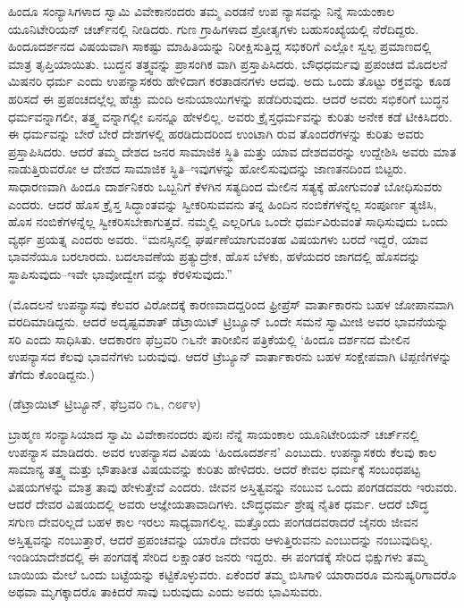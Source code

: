 ಹಿಂದೂ ಸಂನ್ಯಾಸಿಗಳಾದ ಸ್ವಾಮಿ ವಿವೇಕಾನಂದರು ತಮ್ಮ ಎರಡನೆ ಉಪ ನ್ಯಾಸವನ್ನು ನಿನ್ನೆ ಸಾಯಂಕಾಲ ಯೂನಿಟೇರಿಯನ್​ ಚರ್ಚ್​ನಲ್ಲಿ ನೀಡಿದರು. ಗುಣ ಗ್ರಾಹಿಗಳಾದ ಶ್ರೋತೃಗಳು ಬಹುಸಂಖ್ಯೆಯಲ್ಲಿ ನೆರೆದಿದ್ದರು. ಹಿಂದೂದರ್ಶನದ ವಿಷಯವಾಗಿ ಸಾಕಷ್ಟು ಮಾಹಿತಿಯನ್ನು ನಿರೀಕ್ಷಿಸುತ್ತಿದ್ದ ಸಭಿಕರಿಗೆ ಎಲ್ಲೋ ಸ್ವಲ್ಪ ಪ್ರಮಾಣದಲ್ಲಿ ಮಾತ್ರ ತೃಪ್ತಿಯಾಯಿತು. ಬುದ್ಧನ ತತ್ತ್ವವನ್ನು ಪ್ರಾಸಂಗಿಕ ವಾಗಿ ಪ್ರಸ್ತಾಪಿಸಿದರು. ಬೌಧಧರ್ಮವು ಪ್ರಪಂಚದ ಮೊದಲನೆ ಮಿಷನರಿ ಧರ್ಮ ಎಂದು ಉಪನ್ಯಾಸಕರು ಹೇಳಿದಾಗ ಕರತಾಡನಗಳು ಆದವು. ಅದು ಒಂದು ತೊಟ್ಟು ರಕ್ತವನ್ನು ಕೂಡ ಹರಿಸದೆ ಈ ಪ್ರಪಂಚದಲ್ಲೆಲ್ಲ ಹೆಚ್ಚು ಮಂದಿ ಅನುಯಾಯಿಗಳನ್ನು ಪಡೆದಿರುವುದು. ಆದರೆ ಅವರು ಸಭಿಕರಿಗೆ ಬುದ್ಧನ ಧರ್ಮವನ್ನಾಗಲೀ, ತತ್ತ್ವ ವನ್ನಾಗಲ್ಲೀ ಏನನ್ನೂ ಹೇಳಲಿಲ್ಲ. ಅವರು ಕ್ರೈಸ್ತಧರ್ಮವನ್ನು ಕುರಿತು ಅನೇಕ ಕಡೆ ಟೀಕಿಸಿದರು. ಈ ಧರ್ಮವನ್ನು ಬೇರೆ ಬೇರೆ ದೇಶಗಳಲ್ಲಿ ಹರಡಿದುದರಿಂದ ಉಂಟಾಗಿ ರುವ ತೊಂದರೆಗಳನ್ನು ಕುರಿತು ಅವರು ಪ್ರಸ್ತಾಪಿಸಿದರು. ಆದರೆ ತಮ್ಮ ದೇಶದ ಜನರ ಸಾಮಾಜಿಕ ಸ್ಥಿತಿ ಮತ್ತು ಯಾವ ದೇಶದವರನ್ನು ಉದ್ದೇಶಿಸಿ ಅವರು ಮಾತ ನಾಡುತ್ತಿರುವರೋ ಆ ದೇಶದ ಸಾಮಾಜಿಕ ಸ್ಥಿತಿ–ಇವುಗಳನ್ನು ಹೋಲಿಸುವುದನ್ನು ಜಾಣತನದಿಂದ ಬಿಟ್ಟರು. ಸಾಧಾರಣವಾಗಿ ಹಿಂದೂ ದಾರ್ಶನಿಕರು ಒಬ್ಬನಿಗೆ ಕೆಳಗಿನ ಸತ್ಯದಿಂದ ಮೇಲಿನ ಸತ್ಯಕ್ಕೆ ಹೋಗುವಂತೆ ಬೋಧಿಸುವರು ಎಂದರು. ಆದರೆ ಹೊಸ ಕ್ರೈಸ್ತ ಸಿದ್ಧಾಂತವನ್ನು ಸ್ವೀಕರಿಸುವವನು ತನ್ನ ಹಿಂದಿನ ನಂಬಿಕೆಗಳನ್ನೆಲ್ಲ ಸಂಪೂರ್ಣ ತ್ಯಜಿಸಿ, ಹೊಸ ನಂಬಿಕೆಗಳನ್ನೆಲ್ಲ ಸ್ವೀಕರಿಸಬೇಕಾಗುತ್ತದೆ. ನಮ್ಮಲ್ಲಿ ಎಲ್ಲರಿಗೂ ಒಂದೇ ಧರ್ಮವಿರುವಂತೆ ಸಾಧಿಸುವುದು ಒಂದು ವ್ಯರ್ಥ ಪ್ರಯತ್ನ ಎಂದರು ಅವರು. “ಮನಸ್ಸಿನಲ್ಲಿ ಘರ್ಷಣೆಯಾಗುವಂತಹ ವಿಷಯಗಳು ಬರದೆ ಇದ್ದರೆ, ಯಾವ ಭಾವನೆಯೂ ಬರಲಾರದು. ಬದಲಾವಣೆಯ ಪ್ರತ್ಯುದ್ರೇಕ, ಹೊಸ ಬೆಳಕು, ಹಳೆಯದರ ಜಾಗದಲ್ಲಿ ಹೊಸದನ್ನು ಸ್ಥಾಪಿಸುವುದು–ಇವೇ ಭಾವೋದ್ವೇಗ ವನ್ನು ಕೆರಳಿಸುವುದು.”

\begin{center}
(ಮೊದಲನೆ ಉಪನ್ಯಾಸವು ಕೆಲವರ ವಿರೋದಕ್ಕೆ ಕಾರಣವಾದದ್ದರಿಂದ ಫ್ರೀಪ್ರೆಸ್​ ವಾರ್ತಾಕಾರನು ಬಹಳ ಜೋಪಾನವಾಗಿ ವರದಿಮಾಡಿದ್ದನು. ಆದರೆ ಅದೃಷ್ಟವಶಾತ್​ ಡೆಟ್ರಾಯಿಟ್​ ಟ್ರಿಬ್ಯೂನ್​ ಒಂದೇ ಸಮನೆ ಸ್ವಾಮೀಜಿ ಅವರ ಭಾವನೆಯನ್ನು ಸರಿ ಎಂದು ಸಾಧಿಸಿತು. ಆದಕಾರಣ ಫೆಬ್ರವರಿ ೧೬ನೇ ತಾರೀಖಿನ ಪತ್ರಿಕೆಯಲ್ಲಿ ‘ಹಿಂದೂ ದರ್ಶನದ ಮೇಲಿನ ಉಪನ್ಯಾಸದ ಕೆಲವು ಭಾವನೆಗಳು ಬರುವುವು. ಆದರೆ ಟ್ರೆಬ್ಯೂನ್​ ವಾರ್ತಾಕಾರನು ಬಹಳ ಸಂಕ್ಷೇಪವಾಗಿ ಟಿಪ್ಪಣಿಗಳನ್ನು ತೆಗೆದು ಕೊಂಡಿದ್ದನು.)
\end{center}

\begin{center}
(ಡೆಟ್ರಾಯಿಟ್​ ಟ್ರಿಬ್ಯೂನ್​, ಫೆಬ್ರವರಿ ೧೬, ೧೮೯೪)
\end{center}

ಬ್ರಾಹ್ಮಣ ಸಂನ್ಯಾಸಿಯಾದ ಸ್ವಾಮಿ ವಿವೇಕಾನಂದರು ಪುನಃ ನೆನ್ನೆ ಸಾಯಂಕಾಲ ಯೂನಿಟೇರಿಯನ್​ ಚರ್ಚ್​ನಲ್ಲಿ ಉಪನ್ಯಾಸ ಮಾಡಿದರು. ಅವರ ಉಪನ್ಯಾಸದ ವಿಷಯ ‘ಹಿಂದೂದರ್ಶನ’ ಎಂಬುದು. ಉಪನ್ಯಾಸಕರು ಕೆಲವು ಕಾಲ ಸಾಮಾನ್ಯ ತತ್ತ್ವ ಮತ್ತು ಭೌತಾತೀತ ವಿಷಯವನ್ನು ಕುರಿತು ಹೇಳಿದರು. ಆದರೆ ಕೇವಲ ಧರ್ಮಕ್ಕೆ ಸಂಬಂಧಪಟ್ಟ ವಿಷಯಗಳನ್ನು ಮಾತ್ರ ತಾವು ಹೇಳುತ್ತೇವೆ ಎಂದರು. ಜೀವನ ಅಸ್ತಿತ್ವವನ್ನು ನಂಬುವ ಒಂದು ಪಂಗಡದವರು ಇರುವರು. ಆದರೆ ದೇವರ ವಿಷಯದಲ್ಲಿ ಅವರು ಆಜ್ಞೇಯತಾವಾದಿಗಳು. ಬೌದ್ಧಧರ್ಮ ಶ್ರೇಷ್ಠ ನೈತಿಕ ಧರ್ಮ. ಆದರೆ ಬೌದ್ಧ ಸಗುಣ ದೇವರಿಲ್ಲದೆ ಬಹಳ ಕಾಲ ಇರಲು ಸಾಧ್ಯವಾಗಲಿಲ್ಲ. ಮತ್ತೊಂದು ಪಂಗಡದವರಾದರೆ ಜೈನರು ಜೀವನ ಅಸ್ತಿತ್ವವನ್ನು ನಂಬುತ್ತಾರೆ, ಆದರೆ ಪ್ರಪಂಚವನ್ನು ಯಾರೊ ದೇವರು ಆಳುತ್ತಿರುವನು ಎಂಬುದನ್ನು ನಂಬುವುದಿಲ್ಲ. ಇಂಡಿಯಾದೇಶದಲ್ಲಿ ಈ ಪಂಗಡಕ್ಕೆ ಸೇರಿದ ಲಕ್ಷಾಂತರ ಜನರು ಇದ್ದರು. ಈ ಪಂಗಡಕ್ಕೆ ಸೇರಿದ ಭಿಕ್ಷುಗಳು ತಮ್ಮ ಬಾಯಿಯ ಮೇಲೆ ಒಂದು ಬಟ್ಟೆಯನ್ನು ಕಟ್ಟಿಕೊಳ್ಳುವರು. ಏಕೆಂದರೆ ತಮ್ಮ ಬಿಸಿಗಾಳಿ ಯಾರಾದರೂ ಮನುಷ್ಯರಿಗಾದರೊ ಅಥವಾ ಮೃಗಕ್ಕಾದರೊ ತಾಕಿದರೆ ಸಾವು ಬರುವುದು ಎಂದು ಅವರು ಭಾವಿಸುವರು.

